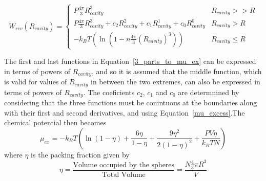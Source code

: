 \documentclass[double,12pt]{beavtex}
\begin{document}
\begin{equation}\label{3_parts_to_mu_ex}{W_{rev}(R_{cavity})=\left\{ \begin{array}{rc} P\frac{4\pi}{3}R_{cavity}^3 & R_{cavity} >> R 
\\ P\frac{4\pi}{3}R_{cavity}^3 + c_2R_{cavity}^2 + c_1R_{cavity}^1 + c_0R_{cavity}^0  & R_{cavity} > R \\ -k_BT(\ln(1-n\frac{4\pi}{3}(R_{cavity})^3)) & R_{cavity} \leq R\end{array}\right.}\end{equation}


The first and last functions in Equation~\ref{3_parts_to_mu_ex} can be expressed in terms of powers of $R_{cavity}$, 
and so it is assumed that the middle function, which is valid for values of $R_{cavity}$ in between the two extremes, 
can also be expressed in terms of powers of $R_{cavity}$.  
The coeficients $c_2$, $c_1$ and $c_0$ are determnined by considering that the three functions must be conintuous at the boundaries along with their first and second derivatives, and using Equation~\ref{mu_excess}.The chemical potential then becomes
\begin{equation}\mu_{ex}=-k_BT\left(\ln(1-\eta) + \frac{6\eta}{1-\eta}+\frac{9\eta^2}{2(1-\eta)^2}+\frac{PV\eta}{k_BTN}\right)\end{equation}
where $\eta$ is the packing fraction given by
\begin{displaymath}\eta = \frac{\mbox{Volume occupied by the spheres}}{\mbox{Total Volume}}=\frac{N\frac{4}{3}\pi{R}^3}{V}\end{displaymath} 

\end{document}
